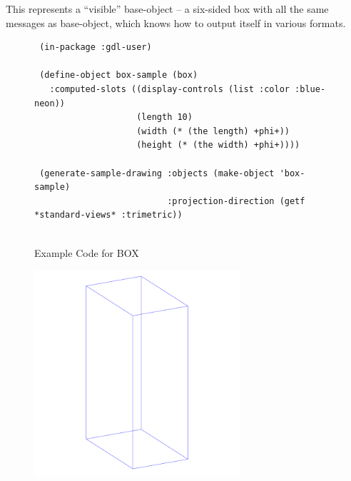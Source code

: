 \documentclass [11pt]{book}
\begin{document}
\begin{itemize}
\begin{description}
This represents a ``visible'' base-object -- a six-sided box with all the same
messages as base-object, which knows how to output itself in various formats.



\end{description}




\begin{figure}
\begin{lrbox}{\boxedverb}
\begin{minipage}{\linewidth}
{\small

\begin{verbatim}
 (in-package :gdl-user)

 (define-object box-sample (box)
   :computed-slots ((display-controls (list :color :blue-neon))
                    (length 10)
                    (width (* (the length) +phi+))
                    (height (* (the width) +phi+))))

 (generate-sample-drawing :objects (make-object 'box-sample)
                          :projection-direction (getf *standard-views* :trimetric))


\end{verbatim}}
\end{minipage}
\end{lrbox}
\fbox{\usebox{\boxedverb}}

\caption{Example Code for BOX}

\label{fig:example-code-BOX}

\end{figure}

\begin{figure}
\begin{center}
\includegraphics[width=3in,height=3in]{../images/example-BOX.pdf}
\end{center}


\end{figure}
\end{itemize}
\end{document}
